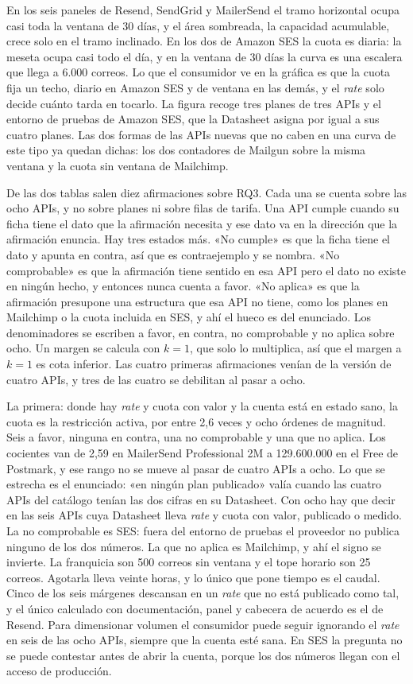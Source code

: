 En los seis paneles de Resend, SendGrid y MailerSend el tramo horizontal ocupa casi toda la ventana de 30 días, y el área sombreada, la capacidad acumulable, crece solo en el tramo inclinado.
En los dos de Amazon SES la cuota es diaria: la meseta ocupa casi todo el día, y en la ventana de 30 días la curva es una escalera que llega a 6.000 correos.
Lo que el consumidor ve en la gráfica es que la cuota fija un techo, diario en Amazon SES y de ventana en las demás, y el \textit{rate} solo decide cuánto tarda en tocarlo.
La figura recoge tres planes de tres APIs y el entorno de pruebas de Amazon SES, que la Datasheet asigna por igual a sus cuatro planes.
Las dos formas de las APIs nuevas que no caben en una curva de este tipo ya quedan dichas: los dos contadores de Mailgun sobre la misma ventana y la cuota sin ventana de Mailchimp.

De las dos tablas salen diez afirmaciones sobre RQ3.
Cada una se cuenta sobre las ocho APIs, y no sobre planes ni sobre filas de tarifa.
Una API cumple cuando su ficha tiene el dato que la afirmación necesita y ese dato va en la dirección que la afirmación enuncia.
Hay tres estados más.
«No cumple» es que la ficha tiene el dato y apunta en contra, así que es contraejemplo y se nombra.
«No comprobable» es que la afirmación tiene sentido en esa API pero el dato no existe en ningún hecho, y entonces nunca cuenta a favor.
«No aplica» es que la afirmación presupone una estructura que esa API no tiene, como los planes en Mailchimp o la cuota incluida en SES, y ahí el hueco es del enunciado.
Los denominadores se escriben a favor, en contra, no comprobable y no aplica sobre ocho.
Un margen se calcula con $k = 1$, que solo lo multiplica, así que el margen a $k = 1$ es cota inferior.
Las cuatro primeras afirmaciones venían de la versión de cuatro APIs, y tres de las cuatro se debilitan al pasar a ocho.

La primera: donde hay \textit{rate} y cuota con valor y la cuenta está en estado sano, la cuota es la restricción activa, por entre 2,6 veces y ocho órdenes de magnitud.
Seis a favor, ninguna en contra, una no comprobable y una que no aplica.
Los cocientes van de 2,59 en MailerSend Professional 2M a 129.600.000 en el Free de Postmark, y ese rango no se mueve al pasar de cuatro APIs a ocho.
Lo que se estrecha es el enunciado: «en ningún plan publicado» valía cuando las cuatro APIs del catálogo tenían las dos cifras en su Datasheet.
Con ocho hay que decir en las seis APIs cuya Datasheet lleva \textit{rate} y cuota con valor, publicado o medido.
La no comprobable es SES: fuera del entorno de pruebas el proveedor no publica ninguno de los dos números.
La que no aplica es Mailchimp, y ahí el signo se invierte.
La franquicia son 500 correos sin ventana y el tope horario son 25 correos.
Agotarla lleva veinte horas, y lo único que pone tiempo es el caudal.
Cinco de los seis márgenes descansan en un \textit{rate} que no está publicado como tal, y el único calculado con documentación, panel y cabecera de acuerdo es el de Resend.
Para dimensionar volumen el consumidor puede seguir ignorando el \textit{rate} en seis de las ocho APIs, siempre que la cuenta esté sana.
En SES la pregunta no se puede contestar antes de abrir la cuenta, porque los dos números llegan con el acceso de producción.

